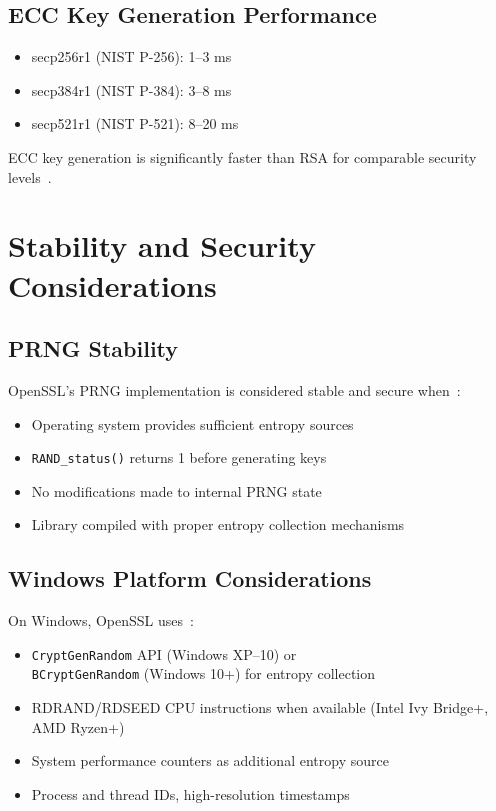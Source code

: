 \subsection{ECC Key Generation Performance}
\begin{itemize}
    \item secp256r1 (NIST P-256): 1--3 ms
    \item secp384r1 (NIST P-384): 3--8 ms
    \item secp521r1 (NIST P-521): 8--20 ms
\end{itemize}

ECC key generation is significantly faster than RSA for comparable security levels~\cite{hankerson2006guide}.

\section{Stability and Security Considerations}

\subsection{PRNG Stability}
OpenSSL's PRNG implementation is considered stable and secure when~\cite{viega2002network}:
\begin{itemize}
    \item Operating system provides sufficient entropy sources
    \item \texttt{RAND\_status()} returns 1 before generating keys
    \item No modifications made to internal PRNG state
    \item Library compiled with proper entropy collection mechanisms
\end{itemize}

\subsection{Windows Platform Considerations}
On Windows, OpenSSL uses~\cite{microsoft_crypto}:
\begin{itemize}
    \item \texttt{CryptGenRandom} API (Windows XP--10) or \\
          \texttt{BCryptGenRandom} (Windows 10+) for entropy collection
    \item RDRAND/RDSEED CPU instructions when available (Intel Ivy Bridge+, AMD Ryzen+)
    \item System performance counters as additional entropy source
    \item Process and thread IDs, high-resolution timestamps
\end{itemize}

